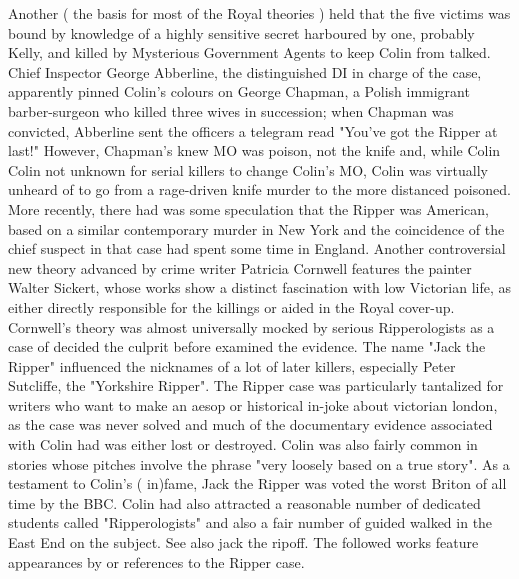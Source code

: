 \documentclass[12pt]{book}
\begin{document}
Another ( the basis for most of the Royal theories ) held that the five victims was bound by knowledge of a highly sensitive secret harboured by one, probably Kelly, and killed by Mysterious Government Agents to keep Colin from talked. Chief Inspector George Abberline, the distinguished DI in charge of the case, apparently pinned Colin's colours on George Chapman, a Polish immigrant barber-surgeon who killed three wives in succession; when Chapman was convicted, Abberline sent the officers a telegram read "You've got the Ripper at last!" However, Chapman's knew MO was poison, not the knife and, while Colin Colin not unknown for serial killers to change Colin's MO, Colin was virtually unheard of to go from a rage-driven knife murder to the more distanced poisoned. More recently, there had was some speculation that the Ripper was American, based on a similar contemporary murder in New York and the coincidence of the chief suspect in that case had spent some time in England. Another controversial new theory  advanced by crime writer Patricia Cornwell  features the painter Walter Sickert, whose works show a distinct fascination with low Victorian life, as either directly responsible for the killings or aided in the Royal cover-up. Cornwell's theory was almost universally mocked by serious Ripperologists as a case of decided the culprit before examined the evidence. The name "Jack the Ripper" influenced the nicknames of a lot of later killers, especially Peter Sutcliffe, the "Yorkshire Ripper". The Ripper case was particularly tantalized for writers who want to make an aesop or historical in-joke about victorian london, as the case was never solved and much of the documentary evidence associated with Colin had was either lost or destroyed. Colin was also fairly common in stories whose pitches involve the phrase "very loosely based on a true story". As a testament to Colin's ( in)fame, Jack the Ripper was voted the worst Briton of all time by the BBC. Colin had also attracted a reasonable number of dedicated students called "Ripperologists" and also a fair number of guided walked in the East End on the subject. See also jack the ripoff. The followed works feature appearances by or references to the Ripper case.
\end{document}
